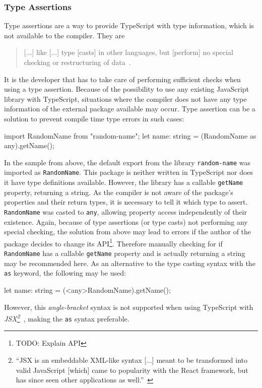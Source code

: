 \subsubsection{Type Assertions}
\label{sec:ts-type-assertions}

Type assertions are a way to provide TypeScript with type information, which is not available to the compiler. They are 
\begin{quote}
  [...] like [...] type [casts] in other languages, but [perform] no special checking or restructuring of data~\cite{TypeScriptHandbook:BasicTypes}.
\end{quote}
It is the developer that has to take care of performing sufficient checks when using a type assertion. Because of the possibility to use any existing JavaScript library with TypeScript, situations where the compiler does not have any type information of the external package available may occur. Type assertion can be a solution to prevent compile time type errors in such cases:
\begin{JsCode}[numbers=none]
import RandomName from "random-name";
let name: string = (RandomName as any).getName();
\end{JsCode}
In the sample from above, the default export from the library \texttt{random-name} was imported as \texttt{RandomName}. This package is neither written in TypeScript nor does it have type definitions available. However, the library has a callable \texttt{getName} property, returning a string. As the compiler is not aware of the package's properties and their return types, it is necessary to tell it which type to assert. \texttt{RandomName} was casted to \texttt{any}, allowing property access independently of their existence. Again, because of type assertions (or type casts) not performing any special checking, the solution from above may lead to errors if the author of the package decides to change its API\footnote{TODO: Explain API}. Therefore manually checking for if \texttt{RandomName} has a callable \texttt{getName} property and is actually returning a string may be recommended here.
As an alternative to the type casting syntax with the \texttt{as} keyword, the following may be used:
\begin{JsCode}[numbers=none]
let name: string = (<any>RandomName).getName();
\end{JsCode}
However, this \emph{angle-bracket} syntax is not supported when using TypeScript with \emph{JSX\footnote{``JSX is an embeddable XML-like syntax [...] meant to be transformed into valid JavaScript [which] came to popularity with the React framework, but has since seen other applications as well.''~\cite{TypeScriptHandbook:JSX}}}~\cite{TypeScriptHandbook:BasicTypes}, making the \texttt{as} syntax preferable.

